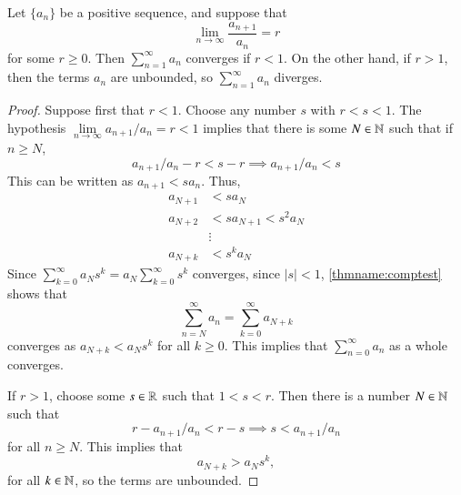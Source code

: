 \documentclass[12pt, a4paper, oneside, openright, titlepage]{book}
\begin{document}
\begin{namthm}\label{thmname:ratio}
    Let $\{a_n\}$ be a positive sequence, and suppose that \begin{equation*}
        \lim\limits_{n\rightarrow \infty}\frac{a_{n+1}}{a_n} = r
    \end{equation*}
    for some $r \geq 0$. Then $\sum\limits_{n=1}^{\infty}a_n$ converges if $r < 1$. On the other hand, if $r > 1$, then the terms $a_n$ are unbounded, so $\sum\limits_{n=1}^{\infty}a_n$ diverges.
\end{namthm}
\begin{proof}
    Suppose first that $r<1$. Choose any number $s$ with $r < s < 1$. The hypothesis $\lim\limits_{n\rightarrow \infty}a_{n+1}/a_n = r < 1$ implies that there is some $N \in \mathbb N$ such that if $n \geq N$, \begin{equation*}
        a_{n+1}/a_n - r < s-r \implies a_{n+1}/a_n < s
    \end{equation*}
    This can be written as $a_{n+1} < sa_n$. Thus, \begin{align*}
        a_{N+1} &< sa_N \\
        a_{N+2} &< sa_{N+1} < s^2a_N \\
        &\vdots \\
        a_{N+k} &< s^ka_N
    \end{align*}
    Since $\sum\limits_{k=0}^{\infty}a_Ns^k = a_N\sum\limits_{k=0}^{\infty}s^k$ converges, since $|s| < 1$, \ref{thmname:comptest} shows that \begin{equation*}
        \sum\limits_{n=N}^{\infty}a_n = \sum\limits_{k=0}^{\infty}a_{N+k}
    \end{equation*}
    converges as $a_{N+k} < a_Ns^k$ for all $k \geq 0$. This implies that $\sum\limits_{n=0}^{\infty}a_n$ as a whole converges.

    If $r > 1$, choose some $s \in \mathbb R$ such that $1 < s < r$. Then there is a number $N \in \mathbb N$ such that \begin{equation*}
        r - a_{n+1}/a_n < r-s \implies s < a_{n+1}/a_n
    \end{equation*}
    for all $n \geq N$. This implies that \begin{equation*}
        a_{N+k} > a_Ns^k,
    \end{equation*}
    for all $k \in \mathbb N$, so the terms are unbounded.
\end{proof}
\end{document}
